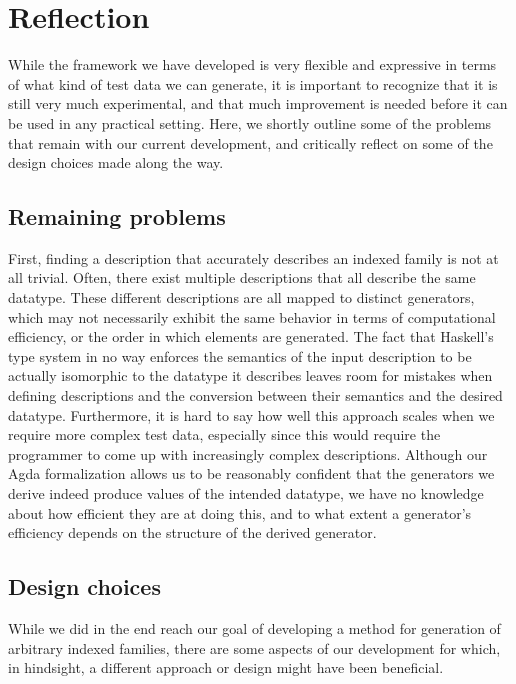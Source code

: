 \documentclass[a4paper,msc,twosized=semi]{uustthesis}
\begin{document}
\section{Reflection}

  While the framework we have developed is very flexible and expressive in terms of what 
  kind of test data we can generate, it is important to recognize that it is still very 
  much experimental, and that much improvement is needed before it can be used in any 
  practical setting. Here, we shortly outline some of the problems that remain with 
  our current development, and critically reflect on some of the design choices 
  made along the way. 

\subsection{Remaining problems}

  First, finding a description that accurately describes an indexed family is not at all trivial. Often, there exist 
  multiple descriptions that all describe the same datatype. These different 
  descriptions are all mapped to distinct generators, which may not necessarily 
  exhibit the same behavior in terms of computational efficiency, or the order in 
  which elements are generated. The fact that Haskell's type system in no way enforces 
  the semantics of the input description to be actually isomorphic to the datatype it 
  describes leaves room for mistakes when defining descriptions and the conversion 
  between their semantics and the desired datatype. Furthermore, it is hard to say how 
  well this approach scales when we require more complex test data, especially since 
  this would require the programmer to come up with increasingly complex descriptions. 
  Although our Agda formalization allows us to be reasonably confident that the 
  generators we derive indeed produce values of the intended datatype, we have no 
  knowledge about how efficient they are at doing this, and to what extent a 
  generator's efficiency depends on the structure of the derived generator. 

\subsection{Design choices}

  While we did in the end reach our goal of developing a method for generation of 
  arbitrary indexed families, there are some aspects of our development for which, 
  in hindsight, a different approach or design might have been beneficial. 
\end{document}

